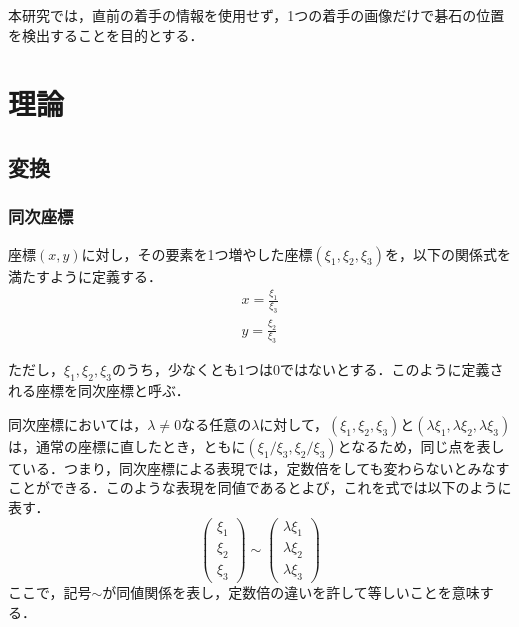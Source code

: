 \documentclass[openright]{nitocs}
\numberwithin{equation}{section}
\begin{document}
        本研究では，直前の着手の情報を使用せず，1つの着手の画像だけで碁石の位置を検出することを目的とする．

    \section{理論} %
    \label{config}
        \subsection{変換}
            \subsubsection{同次座標}
                座標$(x,y)$に対し，その要素を1つ増やした座標$(\xi_1,\xi_2,\xi_3)$を，以下の関係式を満たすように定義する．\\
                \begin{equation} %
                    \begin{split} %
                        x = \frac{\xi_1}{\xi_3} \\ 
                        y = \frac{\xi_2}{\xi_3}
                    \end{split}
                    \label{Homogeneous}
                \end{equation}

                ただし，$\xi_1,\xi_2,\xi_3$のうち，少なくとも1つは0ではないとする．このように定義される座標を同次座標と呼ぶ\cite{Homogenous}．

                同次座標においては，$\lambda\neq0$なる任意の$\lambda$に対して，$(\xi_1,\xi_2,\xi_3)$と$(\lambda\xi_1,\lambda\xi_2,\lambda\xi_3)$は，通常の座標に直したとき，ともに$(\xi_1/\xi_3,\xi_2/\xi_3)$となるため，同じ点を表している．つまり，同次座標による表現では，定数倍をしても変わらないとみなすことができる．このような表現を同値であるとよび，これを式では以下のように表す．
                \begin{equation} %
                    \left(
                        \begin{array}{ccc}
                            \xi_1\\
                            \xi_2\\
                            \xi_3
                        \end{array}
                    \right) \sim %
                    \left(
                        \begin{array}{ccc}
                            \lambda\xi_1\\
                            \lambda\xi_2\\
                            \lambda\xi_3
                        \end{array}
                    \right)
                \end{equation}
                ここで，記号$\sim$が同値関係を表し，定数倍の違いを許して等しいことを意味する．
\end{document}
